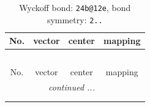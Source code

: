 \documentclass[fleqn,8pt]{jsarticle}
\begin{document}
\renewcommand{\arraystretch}{1.2}
\begin{longtable}{cccc}
\caption{Wyckoff bond: {\tt 24b@12e}, bond symmetry: {\tt 2..}}
 \\
 \hline \hline
No. & vector & center & mapping \\ \hline \endfirsthead

\multicolumn{3}{l}{\tablename\ \thetable{}} \\
 \hline \hline
No. & vector & center & mapping \\ \hline \endhead

 \hline \hline
\multicolumn{3}{r}{\footnotesize\it continued ...} \\ \endfoot

 \hline \hline
\multicolumn{3}{r}{} \\ \endlastfoot


\end{longtable}
\end{document}
